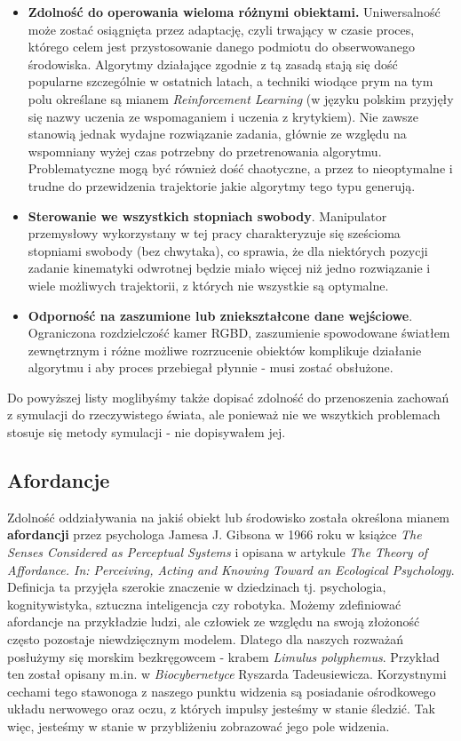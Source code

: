 \documentclass{article}
\begin{document}
\begin{itemize}
\item \textbf{Zdolność do operowania wieloma różnymi obiektami.} Uniwersalność może zostać osiągnięta przez adaptację, czyli trwający w czasie proces, którego celem jest przystosowanie danego podmiotu do obserwowanego środowiska. Algorytmy działające zgodnie z tą zasadą stają się dość popularne szczególnie w ostatnich latach, a techniki wiodące prym na tym polu określane są mianem \emph{Reinforcement Learning} (w języku polskim przyjęły się nazwy uczenia ze wspomaganiem i uczenia z krytykiem). Nie zawsze stanowią jednak wydajne rozwiązanie zadania, głównie ze względu na wspomniany wyżej czas potrzebny do przetrenowania algorytmu. Problematyczne mogą być również dość chaotyczne, a przez to nieoptymalne i trudne do przewidzenia trajektorie jakie algorytmy tego typu generują.

\item \textbf{Sterowanie we wszystkich stopniach swobody}. Manipulator przemysłowy wykorzystany w tej pracy charakteryzuje się sześcioma stopniami swobody (bez chwytaka), co sprawia, że dla niektórych pozycji zadanie kinematyki odwrotnej będzie miało więcej niż jedno rozwiązanie i wiele możliwych trajektorii, z których nie wszystkie są optymalne.

\item \textbf{Odporność na zaszumione lub zniekształcone dane wejściowe}. Ograniczona rozdzielczość kamer RGBD, zaszumienie spowodowane światłem zewnętrznym i różne możliwe rozrzucenie obiektów komplikuje działanie algorytmu i aby proces przebiegał płynnie - musi zostać obsłużone.
\end{itemize}

Do powyższej listy moglibyśmy także dopisać zdolność do przenoszenia zachowań z symulacji do rzeczywistego świata, ale ponieważ nie we wszytkich problemach stosuje się metody symulacji - nie dopisywałem jej.

\subsection*{\LARGE{Afordancje}} 

Zdolność oddziaływania na jakiś obiekt lub środowisko została określona mianem \textbf{afordancji} przez psychologa Jamesa J. Gibsona w 1966 roku w książce \emph{The Senses Considered as Perceptual Systems} i opisana w artykule \emph{The  Theory  of  Affordance.  In:  Perceiving,  Acting  and  Knowing  Toward  an Ecological Psychology}. Definicja ta przyjęła szerokie znaczenie w dziedzinach tj. psychologia, kognitywistyka, sztuczna inteligencja czy robotyka. Możemy zdefiniować afordancje na przykładzie ludzi, ale człowiek ze względu na swoją złożoność często pozostaje niewdzięcznym modelem. Dlatego dla naszych rozważań posłużymy się morskim bezkręgowcem - krabem \emph{Limulus polyphemus}. Przykład ten został opisany m.in. w \emph{Biocybernetyce} Ryszarda Tadeusiewicza. Korzystnymi cechami tego stawonoga z naszego punktu widzenia są posiadanie ośrodkowego układu nerwowego oraz oczu, z których impulsy jesteśmy w stanie śledzić. Tak więc, jesteśmy w stanie w przybliżeniu zobrazować jego pole widzenia. 
\end{document}
